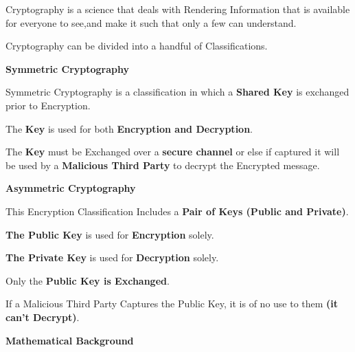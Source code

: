 \documentclass{slides}
\begin{document}
\begin{center}
Cryptography is a science that deals with Rendering Information that is available for everyone to see,and make it such that only a few can understand.
\end{center}
\begin{center}
Cryptography can be divided into a handful of Classifications.
\end{center}

\newpage
\begin{center}
\textbf{\Large Symmetric Cryptography}
\end{center}
\begin{center}
Symmetric Cryptography is a classification in which a \textbf{Shared Key} is exchanged prior to Encryption.
\end{center}
\begin{center}
The \textbf{Key} is used for both \textbf{Encryption and Decryption}.
\end{center}
\begin{center}
The \textbf{Key} must be Exchanged over a \textbf{secure channel} or else if captured it will be used by a \textbf{Malicious Third Party} to decrypt the Encrypted message.
\end{center}
\newpage

\newpage
\begin{center}
\textbf{\Large Asymmetric Cryptography}
\end{center}
\begin{center}
This Encryption Classification Includes a \textbf{Pair of Keys (Public and Private)}.
\end{center}
\begin{center}
\textbf{The Public Key} is used for \textbf{Encryption} solely.
\end{center}
\begin{center}
\textbf{The Private Key} is used for \textbf{Decryption} solely.
\end{center}
\begin{center}
Only the \textbf{Public Key is Exchanged}.
\end{center}
\begin{center}
If a Malicious Third Party Captures the Public Key, it is of no use to them \textbf{(it can't Decrypt)}.
\end{center}
\newpage

\newpage
\begin{center}
\textbf{\Large Mathematical Background}
\end{center}
\end{document}
